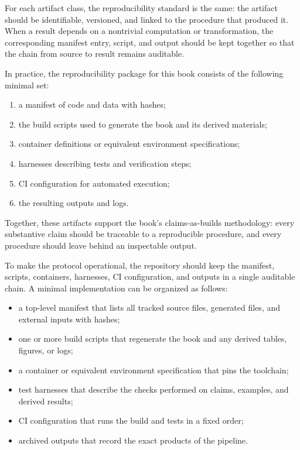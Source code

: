 \documentclass[11pt]{article}
\begin{document}
For each artifact class, the reproducibility standard is the same: the artifact should be identifiable, versioned, and linked to the procedure that produced it. When a result depends on a nontrivial computation or transformation, the corresponding manifest entry, script, and output should be kept together so that the chain from source to result remains auditable.

In practice, the reproducibility package for this book consists of the following minimal set:
\begin{enumerate}
  \item a manifest of code and data with hashes;
  \item the build scripts used to generate the book and its derived materials;
  \item container definitions or equivalent environment specifications;
  \item harnesses describing tests and verification steps;
  \item CI configuration for automated execution;
  \item the resulting outputs and logs.
\end{enumerate}

Together, these artifacts support the book's claims-as-builds methodology: every substantive claim should be traceable to a reproducible procedure, and every procedure should leave behind an inspectable output.

To make the protocol operational, the repository should keep the manifest, scripts, containers, harnesses, CI configuration, and outputs in a single auditable chain. A minimal implementation can be organized as follows:
\begin{itemize}
  \item a top-level manifest that lists all tracked source files, generated files, and external inputs with hashes;
  \item one or more build scripts that regenerate the book and any derived tables, figures, or logs;
  \item a container or equivalent environment specification that pins the toolchain;
  \item test harnesses that describe the checks performed on claims, examples, and derived results;
  \item CI configuration that runs the build and tests in a fixed order;
  \item archived outputs that record the exact products of the pipeline.
\end{itemize}
\end{document}
